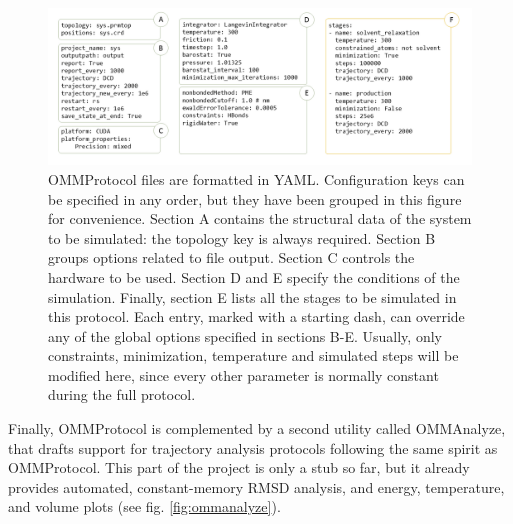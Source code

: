 \begin{figure}[H] %
	\begin{Center}
		\includegraphics[width=\textwidth]{./figures/05/ommprotocol.png}
		\caption[OMMProtocol input file structure]{OMMProtocol files are formatted in YAML. Configuration keys can be specified in any order, but they have been grouped in this figure for convenience. Section A contains the structural data of the system to be simulated: the topology key is always required. Section B groups options related to file output. Section C controls the hardware to be used. Section D and E specify the conditions of the simulation. Finally, section E lists all the stages to be simulated in this protocol. Each entry, marked with a starting dash, can override any of the global options specified in sections B-E. Usually, only constraints, minimization, temperature and simulated steps will be modified here, since every other parameter is normally constant during the full protocol.}
		\label{fig:ommprotocol}
	\end{Center}
\end{figure}


Finally, OMMProtocol is complemented by a second utility called OMMAnalyze, that drafts support for trajectory analysis protocols following the same spirit as OMMProtocol. This part of the project is only a stub so far, but it already provides automated, constant-memory RMSD analysis, and energy, temperature, and volume plots (see fig. \ref{fig:ommanalyze}).





